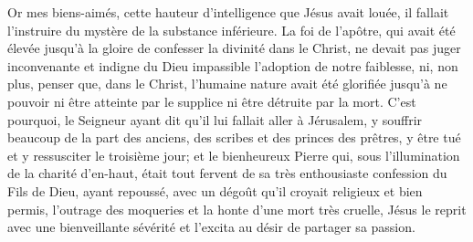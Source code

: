 Or mes biens-aimés, cette hauteur d’intelligence que Jésus avait louée,
	il fallait l’instruire du mystère de la substance inférieure.
La foi de l’apôtre, qui avait été élevée
		jusqu’à la gloire de confesser la divinité dans le Christ,
	ne devait pas juger inconvenante et indigne du Dieu impassible
		l’adoption de notre faiblesse,
	ni, non plus, penser que, dans le Christ,
	l’humaine nature avait été glorifiée
	jusqu’à ne pouvoir ni être atteinte par le supplice
	ni être détruite par la mort.
C’est pourquoi, le Seigneur ayant dit qu’il lui fallait aller à Jérusalem,
	y souffrir beaucoup de la part des anciens,
		des scribes et des princes des prêtres,
	y être tué et y ressusciter le troisième jour;
	et le bienheureux Pierre qui, sous l’illumination de la charité d’en-haut,
	était tout fervent de sa très enthousiaste confession du Fils de Dieu,
	ayant repoussé, avec un dégoût qu’il croyait religieux et bien permis,
	l’outrage des moqueries et la honte d’une mort très cruelle,
	Jésus le reprit avec une bienveillante sévérité
		et l’excita au désir de partager sa passion.
